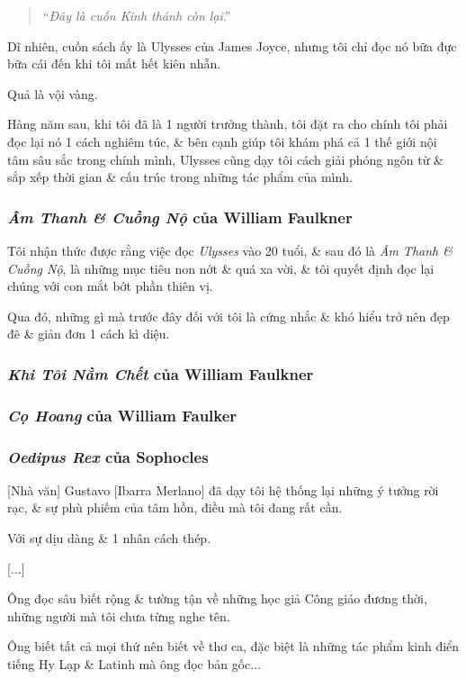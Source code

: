 \documentclass{article}
\begin{document}
\begin{quotation}
	``\textit{Đây là cuốn Kinh thánh còn lại}.''
\end{quotation}
Dĩ nhiên, cuốn sách ấy là Ulysses của James Joyce, nhưng tôi chỉ đọc nó bữa đực bữa cái đến khi tôi mất hết kiên nhẫn.

Quả là vội vàng.

Hàng năm sau, khi tôi đã là 1 người trưởng thành, tôi đặt ra cho chính tôi phải đọc lại nó 1 cách nghiêm túc, \& bên cạnh giúp tôi khám phá cả 1 thế giới nội tâm sâu sắc trong chính mình, Ulysses cũng dạy tôi cách giải phóng ngôn từ \& sắp xếp thời gian \& cấu trúc trong những tác phẩm của mình.

\subsubsection{\textit{Âm Thanh \& Cuồng Nộ} của William Faulkner}
Tôi nhận thức được rằng việc đọc \textit{Ulysses} vào 20 tuổi, \& sau đó là \textit{Âm Thanh \& Cuồng Nộ}, là những mục tiêu non nớt \& quá xa vời, \& tôi quyết định đọc lại chúng với con mắt bớt phần thiên vị.

Qua đó, những gì mà trước đây đối với tôi là cứng nhắc \& khó hiểu trở nên đẹp đẽ \& giản đơn 1 cách kì diệu.

\subsubsection{\textit{Khi Tôi Nằm Chết} của William Faulkner}

\subsubsection{\textit{Cọ Hoang} của William Faulker}

\subsubsection{\textit{Oedipus Rex} của Sophocles}
[Nhà văn] Gustavo [Ibarra Merlano] đã dạy tôi hệ thống lại những ý tưởng rời rạc, \& sự phù phiếm của tâm hồn, điều mà tôi đang rất cần.

Với sự dịu dàng \& 1 nhân cách thép.

[$\ldots$]

%
Ông đọc sâu biết rộng \& tường tận về những học giả Công giáo đương thời, những người mà tôi chưa từng nghe tên.

Ông biết tất cả mọi thứ nên biết về thơ ca, đặc biệt là những tác phẩm kinh điển tiếng Hy Lạp \& Latinh mà ông đọc bản gốc$\ldots$
\end{document}

